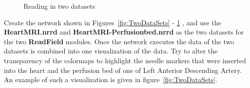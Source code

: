 \documentclass[fleqn,11pt,openany]{book}
\begin{document}
\begin{figure}
\caption{Reading in two datasets}\label{fig:VisParameters}
\end{figure}

Create the network shown in Figures~\ref{fig:TwoDataSets} - \ref{fig:VisParameters}  , and use the {\bf HeartMRI.nrrd} and {\bf HeartMRI-Perfusionbed.nrrd} as the two datasets for the two {\bf ReadField} modules. Once the network executes the data of the two datasets is combined into one visualization of the data. Try to alter the transparency of the colormaps to highlight the needle markers that were inserted into the heart and the perfusion bed of one of Left Anterior Descending Artery. An example of such a visualization is given in figure~\ref{fig:TwoDataSets}.
\end{document}
